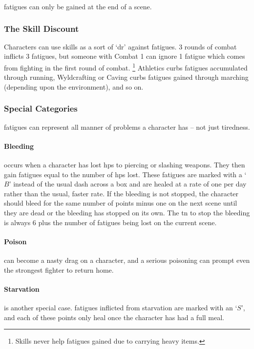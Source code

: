 \begin{multicols}{2}
{}{
  \Glspl{fatigue} can only be gained at the end of a scene.
}

\subsubsection{The Skill Discount}

Characters can use skills as a sort of `\gls{dr}' against \glspl{fatigue}.
3 \glspl{round} of combat inflicts 3 \glspl{fatigue}, but someone with Combat 1 can ignore 1 \gls{fatigue} which comes from fighting in the first round of combat.%
\footnote{Skills never help \glspl{fatigue} gained due to carrying heavy items.}
Athletics curbs \glspl{fatigue} accumulated through running, Wyldcrafting or Caving curbs \glspl{fatigue} gained through marching (depending upon the environment), and so on.

\subsubsection{Special Categories}

\Glspl{fatigue} can represent all manner of problems a character has -- not just tiredness.

\paragraph{Bleeding} occurs when a character has lost \glspl{hp} to piercing or slashing weapons.
They then gain \glspl{fatigue} equal to the number of \glspl{hp} lost.
These \glspl{fatigue} are marked with a `$B$' instead of the usual dash across a box and are healed at a rate of one per day rather than the usual, faster rate.
If the bleeding is not stopped, the character should bleed for the same number of points minus one on the next scene until they are dead or the bleeding has stopped on its own.
The \gls{tn} to stop the bleeding is always 6 plus the number of \glspl{fatigue} being lost on the current scene.

\paragraph{Poison} can become a nasty drag on a character, and a serious poisoning can prompt even the strongest fighter to return home.

\paragraph{Starvation} is another special case.
\glspl{fatigue} inflicted from starvation are marked with an `$S$', and each of these points only heal once the character has had a full meal.


\end{multicols}
